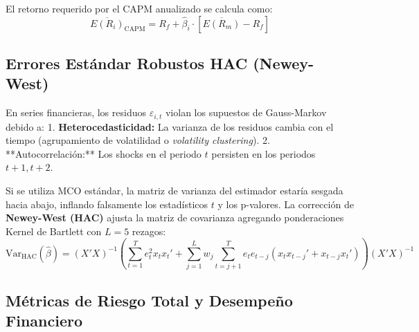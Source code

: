 \documentclass[11pt,a4paper]{article}
\begin{document}
El retorno requerido por el CAPM anualizado se calcula como:
\begin{equation}
\overline{E(R_i)}_{\text{CAPM}} = R_f + \widehat{\beta}_i \cdot \left[ \overline{E(R_m)} - R_f \right]
\end{equation}

\subsection{Errores Estándar Robustos HAC (Newey-West)}
En series financieras, los residuos $\varepsilon_{i,t}$ violan los supuestos de Gauss-Markov debido a:
1. \textbf{Heterocedasticidad:} La varianza de los residuos cambia con el tiempo (agrupamiento de volatilidad o \textit{volatility clustering}).
2. **Autocorrelación:** Los shocks en el periodo $t$ persisten en los periodos $t+1, t+2$.

Si se utiliza MCO estándar, la matriz de varianza del estimador estaría sesgada hacia abajo, inflando falsamente los estadísticos $t$ y los p-valores. La corrección de \textbf{Newey-West (HAC)} ajusta la matriz de covarianza agregando ponderaciones Kernel de Bartlett con $L=5$ rezagos:
\begin{equation}
\text{Var}_{\text{HAC}}(\widehat{\beta}) = (X'X)^{-1} \left( \sum_{t=1}^T e_t^2 x_t x_t' + \sum_{j=1}^L w_j \sum_{t=j+1}^T e_t e_{t-j} (x_t x_{t-j}' + x_{t-j} x_t') \right) (X'X)^{-1}
\end{equation}

\subsection{Métricas de Riesgo Total y Desempeño Financiero}
\end{document}
